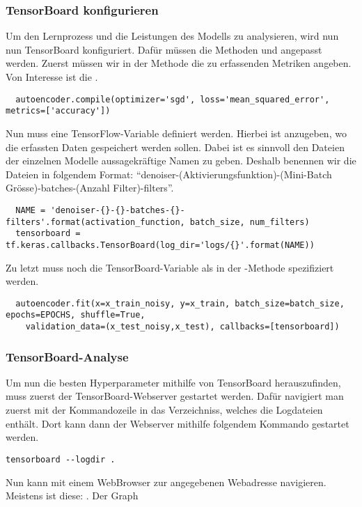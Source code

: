 \subsubsection{TensorBoard konfigurieren}
Um den Lernprozess und die Leistungen des Modells zu analysieren,
wird nun nun TensorBoard konfiguriert.
Dafür müssen die Methoden  und  angepasst werden.
Zuerst müssen wir in der  Methode die zu erfassenden Metriken
angeben. Von Interesse ist die .
\begin{verbatim}
  autoencoder.compile(optimizer='sgd', loss='mean_squared_error', metrics=['accuracy'])
\end{verbatim}
Nun muss eine TensorFlow-Variable definiert werden. Hierbei ist anzugeben, wo
die erfassten Daten gespeichert werden sollen. Dabei ist es sinnvoll den Dateien
der einzelnen Modelle aussagekräftige Namen zu geben. Deshalb benennen wir die
Dateien in folgendem Format: ``denoiser-(Aktivierungsfunktion)-(Mini-Batch
Grösse)-batches-(Anzahl Filter)-filters''.
\begin{verbatim}
  NAME = 'denoiser-{}-{}-batches-{}-filters'.format(activation_function, batch_size, num_filters)
  tensorboard = tf.keras.callbacks.TensorBoard(log_dir='logs/{}'.format(NAME))
\end{verbatim}
Zu letzt muss noch die TensorBoard-Variable als  in der
-Methode spezifiziert werden.
\begin{verbatim}
  autoencoder.fit(x=x_train_noisy, y=x_train, batch_size=batch_size, epochs=EPOCHS, shuffle=True,
    validation_data=(x_test_noisy,x_test), callbacks=[tensorboard])
\end{verbatim}

\subsubsection{TensorBoard-Analyse}
Um nun die besten Hyperparameter mithilfe von TensorBoard herauszufinden, muss
zuerst der TensorBoard-Webserver gestartet werden. Dafür navigiert man zuerst
mit der Kommandozeile in das Verzeichniss, welches die Logdateien enthält.
Dort kann dann der Webserver mithilfe folgendem Kommando gestartet werden.
\begin{verbatim}
tensorboard --logdir .
\end{verbatim}
Nun kann mit einem WebBrowser zur angegebenen Webadresse navigieren. Meistens
ist diese: .
Der Graph

